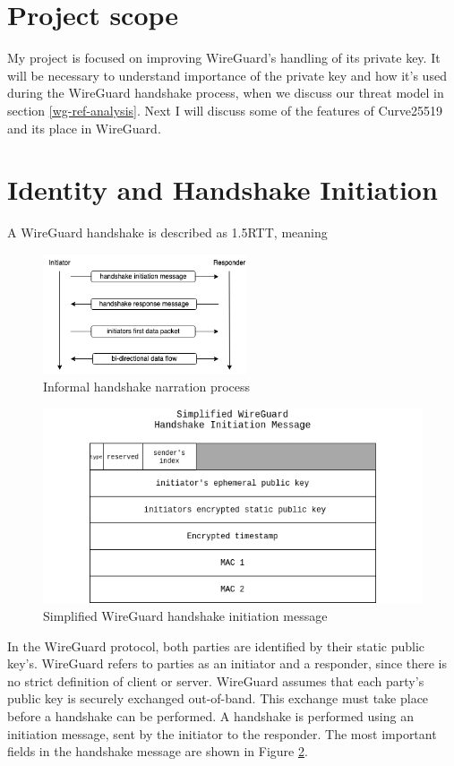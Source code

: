 \documentclass [11pt, proquest] {uwthesis}[2020/02/24]
\begin{document}
\section {Project scope}

My project is focused on improving WireGuard's handling of its private key.
It will be necessary to understand importance of the private key and how it's used during the WireGuard handshake process, when we discuss our threat model in section \ref{wg-ref-analysis}. Next I will discuss some of the features of Curve25519 and its place in WireGuard.




\section {Identity and Handshake Initiation}

A WireGuard handshake is described as 1.5RTT, meaning

\begin{figure}[ht]
\includegraphics[width=6cm]{paper/images/handshake_process.drawio.png}
\caption{Informal handshake narration process}
\label{fig:handshake_process}
\end{figure}


\label{handshake_message}

\begin{figure}[ht]
\includegraphics[width=12cm]{paper/images/Wg_hand_init.drawio.png}
\caption{Simplified WireGuard handshake initiation message}
\label{fig:hand_init}
\end{figure}
In the WireGuard protocol, both parties are identified by their static public key's. WireGuard refers to parties as an initiator and a responder, since there is no strict definition of client or server. WireGuard assumes that each party's public key is securely exchanged out-of-band. This exchange must take place before a handshake can be performed. A handshake is performed using an initiation message, sent by the initiator to the responder. The most important fields in the handshake message are shown in Figure \ref{fig:hand_init}.
\end{document}
